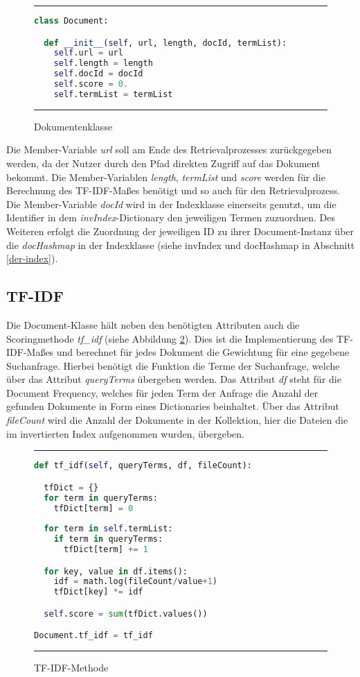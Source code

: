 \begin{figure}
	\rule{\textwidth}{0.4pt}
		\begin{lstlisting}[language=Python]
class Document:

  def __init__(self, url, length, docId, termList):
    self.url = url
    self.length = length
    self.docId = docId
    self.score = 0.
    self.termList = termList
		\end{lstlisting}
	\rule{\textwidth}{0.4pt}
	\caption{Dokumentenklasse}
	\label{fig:document}
\end{figure}

Die Member-Variable \textit{url} soll am Ende des Retrievalprozesses zurückgegeben werden, da der Nutzer durch den Pfad direkten Zugriff auf das Dokument bekommt. Die Member-Variablen \textit{length}, \textit{termList} und \textit{score} werden für die Berechnung des TF-IDF-Maßes benötigt und so auch für den Retrievalprozess. Die Member-Variable \textit{docId} wird in der Indexklasse einerseits genutzt, um die Identifier in dem \textit{invIndex}-Dictionary den jeweiligen Termen zuzuordnen. Des Weiteren erfolgt die Zuordnung der jeweiligen ID zu ihrer Document-Instanz über die \textit{docHashmap} in der Indexklasse (siehe invIndex und docHashmap in Abschnitt \ref{der-index}).

\subsection{TF-IDF}\label{tf-idf}

Die Document-Klasse hält neben den benötigten Attributen auch die Scoringmethode \textit{tf\_idf} (siehe Abbildung \ref{fig:tfidf}). Dies ist die Implementierung des TF-IDF-Maßes und berechnet für jedes Dokument die Gewichtung für eine gegebene Suchanfrage. Hierbei benötigt die Funktion die Terme der Suchanfrage, welche über das Attribut \textit{queryTerms} übergeben werden. Das Attribut \textit{df} steht für die Document Frequency, welches für jeden Term der Anfrage die Anzahl der gefunden Dokumente in Form eines Dictionaries beinhaltet. Über das Attribut \textit{fileCount} wird die Anzahl der Dokumente in der Kollektion, hier die Dateien die im invertierten Index aufgenommen wurden, übergeben.

\begin{figure}
	\rule{\textwidth}{0.4pt}
		\begin{lstlisting}[language=Python]
def tf_idf(self, queryTerms, df, fileCount):

  tfDict = {}
  for term in queryTerms:
    tfDict[term] = 0  
  
  for term in self.termList:
    if term in queryTerms:
      tfDict[term] += 1

  for key, value in df.items():
    idf = math.log(fileCount/value+1)
    tfDict[key] *= idf

  self.score = sum(tfDict.values())

Document.tf_idf = tf_idf
		\end{lstlisting}
	\rule{\textwidth}{0.4pt}
	\caption{TF-IDF-Methode}
	\label{fig:tfidf}
\end{figure}

